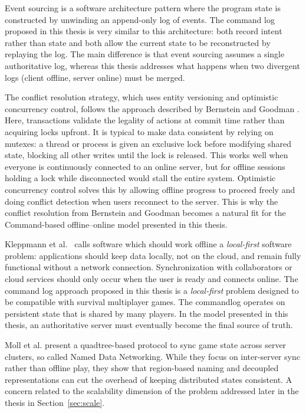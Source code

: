 \documentclass{article}
\begin{document}
Event sourcing \autocite{fowler2005eventsourcing} is a software architecture pattern where the program state is constructed by unwinding an append-only log of events. The command log proposed in this thesis is very similar to this architecture: both record intent rather than state and both allow the current state to be reconstructed by replaying the log. The main difference is that event sourcing assumes a single authoritative log, whereas this thesis addresses what happens when two divergent logs (client offline, server online) must be merged.

The conflict resolution strategy, which uses entity versioning and optimistic concurrency control, follows the approach described by Bernstein and Goodman \autocite{bernstein1981concurrency}. Here, transactions validate the legality of actions at commit time rather than acquiring locks upfront. It is typical to make data consistent by relying on mutexes: a thread or process is given an exclusive lock before modifying shared state, blocking all other writes until the lock is released. This works well when everyone is continuously connected to an online server, but for offline sessions holding a lock while disconnected would stall the entire system. Optimistic concurrency control solves this by allowing offline progress to proceed freely and doing conflict detection when users reconnect to the server. This is why the conflict resolution from Bernstein and Goodman becomes a natural fit for the Command-based offline–online model presented in this thesis.

Kleppmann et al.\ \autocite{kleppmann2019local} calls software which should work offline a \emph{local-first} software problem: applications should keep data locally, not on the cloud, and remain fully functional without a network connection. Synchronization with collaborators or cloud services should only occur when the user is ready and connects online. The command log approach proposed in this thesis is a \emph{local-first} problem designed to be compatible with survival multiplayer games. The commandlog operates on persistent state that is shared by many players. In the model presented in this thesis, an authoritative server must eventually become the final source of truth.

Moll et al. \autocite{MOLL2021107723} present a quadtree-based protocol to sync game state across server clusters, so called Named Data Networking. While they focus on inter-server sync rather than offline play, they show that region-based naming and decoupled representations can cut the overhead of keeping distributed states consistent. A concern related to the scalability dimension of the problem addressed later in the thesis in Section~\ref{sec:scale}.
\end{document}

